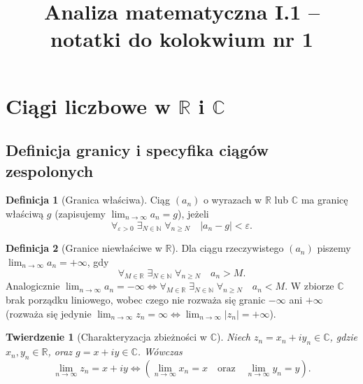 \documentclass[11pt, a4paper]{article}
\title{\textbf{Analiza matematyczna I.1} -- notatki do kolokwium nr 1}
\author{}
\date{}
\theoremstyle{plain}
\newtheorem*{twierdzenie}{Twierdzenie}
\theoremstyle{definition}
\newtheorem*{definicja}{Definicja}
\begin{document}
\maketitle

\tableofcontents

\section{Ciągi liczbowe w $\mathbb{R}$ i $\mathbb{C}$}

\subsection{Definicja granicy i specyfika ciągów zespolonych}

\begin{definicja}[Granica właściwa]
Ciąg $(a_n)$ o wyrazach w $\mathbb{R}$ lub $\mathbb{C}$ ma granicę właściwą $g$ (zapisujemy $\lim_{n\to\infty} a_n = g$), jeżeli
\[
\forall_{\varepsilon > 0} \; \exists_{N \in \mathbb{N}} \; \forall_{n \geqslant N} \quad \lvert a_n - g \rvert < \varepsilon.
\]
\end{definicja}

\begin{definicja}[Granice niewłaściwe w $\mathbb{R}$]
Dla ciągu rzeczywistego $(a_n)$ piszemy $\lim_{n\to\infty} a_n = +\infty$, gdy
\[
\forall_{M \in \mathbb{R}} \; \exists_{N \in \mathbb{N}} \; \forall_{n \geqslant N} \quad a_n > M.
\]
Analogicznie $\lim_{n\to\infty} a_n = -\infty \iff \forall_{M \in \mathbb{R}} \; \exists_{N \in \mathbb{N}} \; \forall_{n \geqslant N} \quad a_n < M$. W zbiorze $\mathbb{C}$ brak porządku liniowego, wobec czego nie rozważa się granic $-\infty$ ani $+\infty$ (rozważa się jedynie $\lim_{n\to\infty} z_n = \infty \iff \lim_{n\to\infty} \lvert z_n \rvert = +\infty$).
\end{definicja}

\begin{twierdzenie}[Charakteryzacja zbieżności w $\mathbb{C}$]
Niech $z_n = x_n + i y_n \in \mathbb{C}$, gdzie $x_n, y_n \in \mathbb{R}$, oraz $g = x + iy \in \mathbb{C}$. Wówczas
\[
\lim_{n\to\infty} z_n = x + iy \iff \left( \lim_{n\to\infty} x_n = x \quad \text{oraz} \quad \lim_{n\to\infty} y_n = y \right).
\]
\end{twierdzenie}
\end{document}
